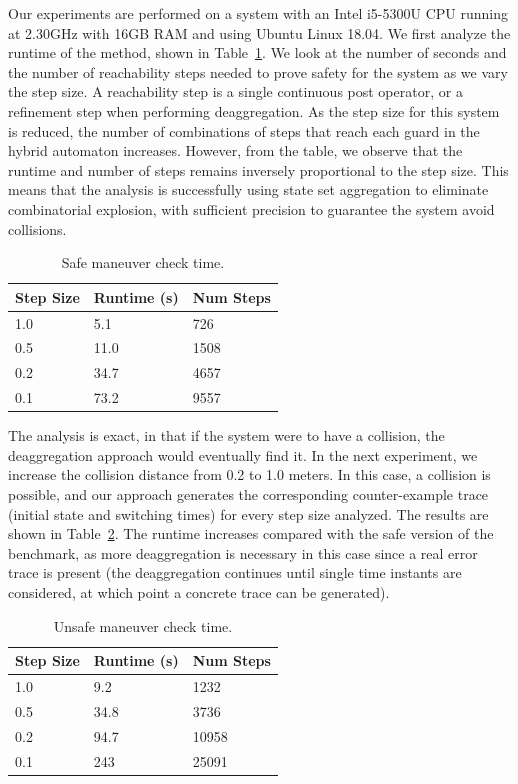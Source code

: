 Our experiments are performed on a system with an Intel i5-5300U CPU running at 2.30GHz with 16GB RAM and using Ubuntu Linux 18.04.
%
We first analyze the runtime of the method, shown in Table~\ref{tab:runtime}.
%
We look at the number of seconds and the number of reachability steps needed to prove safety for the system as we vary the step size.
%
A reachability step is a single continuous post operator, or a refinement step when performing deaggregation.
%
As the step size for this system is reduced, the number of combinations of steps that reach each guard in the hybrid automaton increases.
%
However, from the table, we observe that the runtime and number of steps remains inversely proportional to the step size.
%
This means that the analysis is successfully using state set aggregation to eliminate combinatorial explosion, with sufficient
precision to guarantee the system avoid collisions.

\setlength{\tabcolsep}{2pt}
\begin{table}[t]
\caption{Safe maneuver check time.}
\label{tab:runtime}
\centering
\setlength{\aboverulesep}{0.0pt}
\setlength{\belowrulesep}{0.0pt}
\setlength{\extrarowheight}{-0.2ex}
\begin{tabular}{@{}lll@{}}
  \toprule
  Step Size & Runtime (s) & Num Steps \\
  \midrule
  1.0 & 5.1 & 726 \\
  0.5 & 11.0 & 1508 \\
  0.2 & 34.7 & 4657 \\
  0.1 & 73.2 & 9557 \\
\bottomrule
\end{tabular}
\end{table}

The analysis is exact, in that if the system were to have a collision, the deaggregation approach would eventually find it.
%
In the next experiment, we increase the collision distance from 0.2 to 1.0 meters.
%
In this case, a collision is possible, and our approach generates the corresponding counter-example trace (initial state and switching times)
for every step size analyzed.
%
The results are shown in Table~\ref{tab:runtime_unsafe}.
%
The runtime increases compared with the safe version of the benchmark, as more deaggregation is necessary in this case since a real error trace is
present (the deaggregation continues until single time instants are considered, at which point a concrete trace can be generated).

\setlength{\tabcolsep}{2pt}
\begin{table}[t]
\caption{Unsafe maneuver check time.}
\label{tab:runtime_unsafe}
\centering
\setlength{\aboverulesep}{0.0pt}
\setlength{\belowrulesep}{0.0pt}
\setlength{\extrarowheight}{.0ex}
\begin{tabular}{@{}lll@{}}
  \toprule
  Step Size & Runtime (s) & Num Steps \\
  \midrule
  1.0 & 9.2 & 1232 \\
  0.5 & 34.8 & 3736 \\
  0.2 & 94.7 & 10958 \\
  0.1 & 243 & 25091 \\
\bottomrule
\end{tabular}
\end{table}

